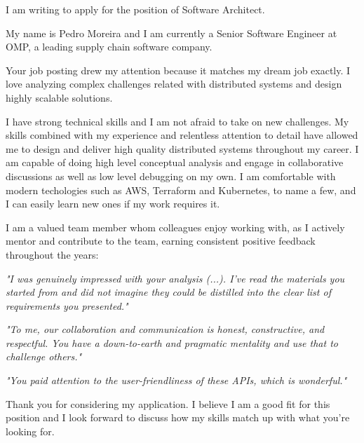 I am writing to apply for the position of Software Architect.

My name is Pedro Moreira and I am currently a Senior Software Engineer at OMP, a leading supply chain software company.

Your job posting drew my attention because it matches my dream job exactly. I love analyzing complex challenges related with distributed systems and design highly scalable solutions.

I have strong technical skills and I am not afraid to take on new challenges. My skills combined with my experience and relentless attention to detail have allowed me to design and deliver high quality distributed systems throughout my career. I am capable of doing high level conceptual analysis and engage in collaborative discussions as well as low level debugging on my own. I am comfortable with modern techologies such as AWS, Terraform and Kubernetes, to name a few, and I can easily learn new ones if my work requires it.

I am a valued team member whom colleagues enjoy working with, as I actively mentor and contribute to the team, earning consistent positive feedback throughout the years:

\emph{"I was genuinely impressed with your analysis (...). I've read the materials you started from and did not imagine they could be distilled into the clear list of requirements you presented."}

\emph{"To me, our collaboration and communication is honest, constructive, and respectful. You have a down-to-earth and pragmatic mentality and use that to challenge others."}

\emph{"You paid attention to the user-friendliness of these APIs, which is wonderful."}

Thank you for considering my application. I believe I am a good fit for this position and I look forward to discuss how my skills match up with what you're looking for.
